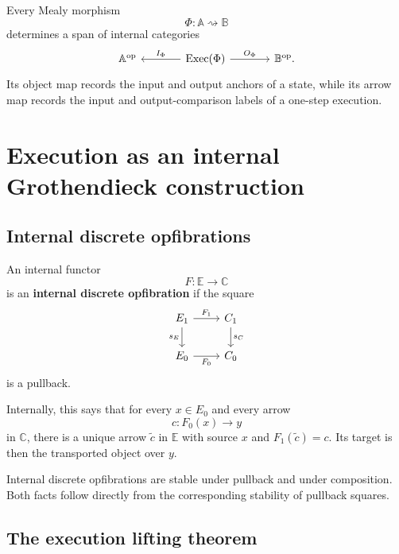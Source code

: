 \begin{theorem}
\label{thm:two-sided-labelled-execution}
Every Mealy morphism
\[
    \Phi:\mathbb A\rightsquigarrow\mathbb B
\]
determines a span of internal categories
\[
\begin{tikzcd}[column sep=large]
    \mathbb A^{\mathrm{op}}
    &
    \operatorname{Exec}(\Phi)
        \arrow[l, "I_\Phi"']
        \arrow[r, "O_\Phi"]
    &
    \mathbb B^{\mathrm{op}}.
\end{tikzcd}
\]
Its object map records the input and output anchors of a state, while its
arrow map records the input and output-comparison labels of a one-step
execution.
\end{theorem}

\section{Execution as an internal Grothendieck construction}
\label{sec:execution-grothendieck-construction}

\subsection{Internal discrete opfibrations}
\label{subsec:internal-discrete-opfibrations}

\begin{definition}
\label{def:internal-discrete-opfibration}
An internal functor
\[
    F:\mathbb E\to\mathbb C
\]
is an \textbf{internal discrete opfibration} if the square
\[
\begin{tikzcd}
    E_1
        \arrow[r,"F_1"]
        \arrow[d,"s_E"']
    &
    C_1
        \arrow[d,"s_C"]
    \\
    E_0
        \arrow[r,"F_0"']
    &
    C_0
\end{tikzcd}
\]
is a pullback.
\end{definition}

Internally, this says that for every \(x\in E_0\) and every arrow
\[
    c:F_0(x)\to y
\]
in \(\mathbb C\), there is a unique arrow \(\widetilde c\) in
\(\mathbb E\) with source \(x\) and \(F_1(\widetilde c)=c\).
Its target is then the transported object over \(y\).

Internal discrete opfibrations are stable under pullback and under
composition. Both facts follow directly from the corresponding stability of
pullback squares.

\subsection{The execution lifting theorem}
\label{subsec:execution-lifting-theorem}

